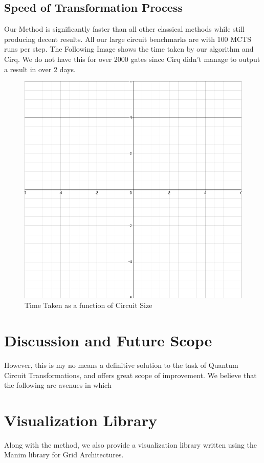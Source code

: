 \documentclass[%
 reprint,
 amsmath,amssymb,
 aps,
]{revtex4-2}
\begin{document}
\subsection{\label{sec:results-rnd}Speed of Transformation Process}

Our Method is significantly faster than all other classical methods while still producing decent results. All our large circuit benchmarks are with 100 MCTS runs per step. The Following Image shows the time taken by our algorithm and Cirq. We do not have this for over 2000 gates since Cirq didn't manage to output a result in over 2 days.

\begin{figure}[H]
    \centering
    \includegraphics[width=0.6\linewidth]{images/dummy_plot.png}
    \caption{Time Taken as a function of Circuit Size}
    \label{fig:results-time}
\end{figure}

\section{Discussion and Future Scope}

However, this is my no means a definitive solution to the task of Quantum Circuit Transformations, and offers great scope of improvement. We believe that the following are avenues in which

\appendix

\section{Visualization Library}

Along with the method, we also provide a visualization library written using the Manim library for Grid Architectures.
\end{document}
